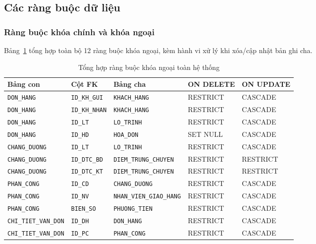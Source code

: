 \documentclass[11pt]{report}
\begin{document}
\subsection{Các ràng buộc dữ liệu}
\label{subsec:rang_buoc}

\subsubsection{Ràng buộc khóa chính và khóa ngoại}
\label{subsubsec:pk_fk}

Bảng~\ref{tab:fk_summary} tổng hợp toàn bộ 12 ràng buộc khóa ngoại, kèm hành vi xử lý khi xóa/cập nhật bản ghi cha.

\begin{table}[H]
    \centering
    \renewcommand{\tabularxcolumn}[1]{m{#1}}
    \begin{tabularx}{\textwidth}{|l|l|l|>{\footnotesize}X|>{\footnotesize}X|} \hline
        \rowcolor{teal!30}
        \textbf{Bảng con} & \textbf{Cột FK} & \textbf{Bảng cha} & \textbf{ON DELETE} & \textbf{ON UPDATE} \\ \hline
        \texttt{DON\_HANG}           & \texttt{ID\_KH\_GUI}  & \texttt{KHACH\_HANG}            & RESTRICT & CASCADE \\ \hline
        \texttt{DON\_HANG}           & \texttt{ID\_KH\_NHAN} & \texttt{KHACH\_HANG}            & RESTRICT & CASCADE \\ \hline
        \texttt{DON\_HANG}           & \texttt{ID\_LT}       & \texttt{LO\_TRINH}              & RESTRICT & CASCADE \\ \hline
        \texttt{DON\_HANG}           & \texttt{ID\_HD}       & \texttt{HOA\_DON}               & SET NULL & CASCADE \\ \hline
        \texttt{CHANG\_DUONG}        & \texttt{ID\_LT}       & \texttt{LO\_TRINH}              & RESTRICT & CASCADE \\ \hline
        \texttt{CHANG\_DUONG}        & \texttt{ID\_DTC\_BD}  & \texttt{DIEM\_TRUNG\_CHUYEN}    & RESTRICT & RESTRICT \\ \hline
        \texttt{CHANG\_DUONG}        & \texttt{ID\_DTC\_KT}  & \texttt{DIEM\_TRUNG\_CHUYEN}    & RESTRICT & RESTRICT \\ \hline
        \texttt{PHAN\_CONG}          & \texttt{ID\_CD}       & \texttt{CHANG\_DUONG}           & RESTRICT & CASCADE \\ \hline
        \texttt{PHAN\_CONG}          & \texttt{ID\_NV}       & \texttt{NHAN\_VIEN\_GIAO\_HANG} & RESTRICT & CASCADE \\ \hline
        \texttt{PHAN\_CONG}          & \texttt{BIEN\_SO}     & \texttt{PHUONG\_TIEN}           & RESTRICT & CASCADE \\ \hline
        \texttt{CHI\_TIET\_VAN\_DON} & \texttt{ID\_DH}       & \texttt{DON\_HANG}              & RESTRICT & CASCADE \\ \hline
        \texttt{CHI\_TIET\_VAN\_DON} & \texttt{ID\_PC}       & \texttt{PHAN\_CONG}             & RESTRICT & CASCADE \\ \hline
    \end{tabularx}
    \caption{Tổng hợp ràng buộc khóa ngoại toàn hệ thống}
    \label{tab:fk_summary}
\end{table}
\end{document}

